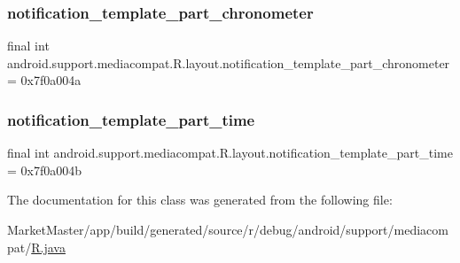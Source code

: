 \subsubsection{\texorpdfstring{notification\+\_\+template\+\_\+part\+\_\+chronometer}{notification\_template\_part\_chronometer}}
{\footnotesize\ttfamily final int android.\+support.\+mediacompat.\+R.\+layout.\+notification\+\_\+template\+\_\+part\+\_\+chronometer = 0x7f0a004a\hspace{0.3cm}{\ttfamily [static]}}

\mbox{\label{classandroid_1_1support_1_1mediacompat_1_1R_1_1layout_ac483500984025c7db556bf3c6d4cfc49}} 
\subsubsection{\texorpdfstring{notification\+\_\+template\+\_\+part\+\_\+time}{notification\_template\_part\_time}}
{\footnotesize\ttfamily final int android.\+support.\+mediacompat.\+R.\+layout.\+notification\+\_\+template\+\_\+part\+\_\+time = 0x7f0a004b\hspace{0.3cm}{\ttfamily [static]}}



The documentation for this class was generated from the following file\+:\begin{DoxyCompactItemize}
\item 
Market\+Master/app/build/generated/source/r/debug/android/support/mediacompat/\mbox{\hyperlink{debug_2android_2support_2mediacompat_2R_8java}{R.\+java}}\end{DoxyCompactItemize}
